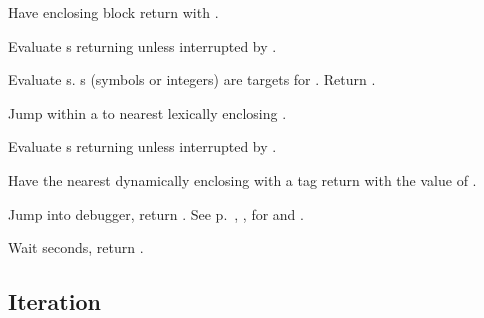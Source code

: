 \begin{LIST}{1cm}
  Have enclosing block return with .

   Evaluate s returning
   unless interrupted by .

  Evaluate s. s (symbols or integers) are targets
  for . Return \retval{\NIL}. 

   Jump within a  to nearest
  lexically enclosing  .

    Evaluate s returning
   unless interrupted by .

   Have the nearest dynamically
  enclosing  with a tag   return with the
  value of .

  Jump into debugger, return \retval{\NIL}.
  See p.\ \pageref{section:Format}, , for 
  and . 

   Wait  seconds, return \retval{\NIL}.

\end{LIST}



\subsection{Iteration}

